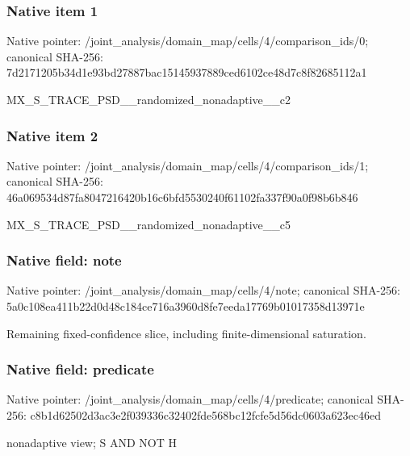 \documentclass[10pt,a4paper]{article}
\begin{document}
\subsubsection{Native item 1}
Native pointer: /joint\_\allowbreak{}analysis/domain\_\allowbreak{}map/cells/4/comparison\_\allowbreak{}ids/0; canonical SHA-256: 7d2171205b34d1e93bd27887bac15145937889ced6102ce48d7c8f82685112a1

\begingroup\raggedright\sloppy MX\_\allowbreak{}S\_\allowbreak{}TRACE\_\allowbreak{}PSD\_\allowbreak{}\_\allowbreak{}randomized\_\allowbreak{}nonadaptive\_\allowbreak{}\_\allowbreak{}c2\par\endgroup

\subsubsection{Native item 2}
Native pointer: /joint\_\allowbreak{}analysis/domain\_\allowbreak{}map/cells/4/comparison\_\allowbreak{}ids/1; canonical SHA-256: 46a069534d87fa8047216420b16c6bfd5530240f61102fa337f90a0f98b6b846

\begingroup\raggedright\sloppy MX\_\allowbreak{}S\_\allowbreak{}TRACE\_\allowbreak{}PSD\_\allowbreak{}\_\allowbreak{}randomized\_\allowbreak{}nonadaptive\_\allowbreak{}\_\allowbreak{}c5\par\endgroup

\subsubsection{Native field: note}
Native pointer: /joint\_\allowbreak{}analysis/domain\_\allowbreak{}map/cells/4/note; canonical SHA-256: 5a0c108ea411b22d0d48c184ce716a3960d8fe7eeda17769b01017358d13971e

\begingroup\raggedright\sloppy Remaining fixed-confidence slice,\allowbreak{} including finite-dimensional saturation.\par\endgroup

\subsubsection{Native field: predicate}
Native pointer: /joint\_\allowbreak{}analysis/domain\_\allowbreak{}map/cells/4/predicate; canonical SHA-256: c8b1d62502d3ac3e2f039336c32402fde568bc12fcfe5d56dc0603a623ec46ed

\begingroup\raggedright\sloppy nonadaptive view;\allowbreak{} S AND NOT H\par\endgroup
\end{document}
